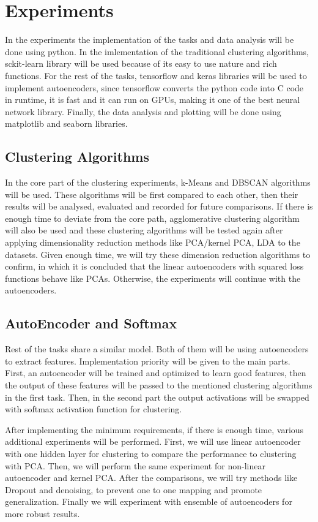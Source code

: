 \documentclass[journal]{IEEEtran}
\begin{document}
\section{Experiments}

In the experiments the implementation of the tasks and data analysis will be done using python. In the imlementation of the traditional clustering algorithms, sckit-learn library will be used because of its easy to use nature and rich functions. For the rest of the tasks, tensorflow and keras libraries will be used to implement autoencoders, since tensorflow converts the python code into C code in runtime, it is fast and it can run on GPUs, making it one of the best neural network library. Finally, the data analysis and plotting will be done using matplotlib and seaborn libraries.

\subsection{Clustering Algorithms}
In the core part of the clustering experiments, k-Means and DBSCAN algorithms will be used. These algorithms will be first compared to each other, then their results will be analysed, evaluated and recorded for future comparisons. If there is enough time to deviate from the core path, agglomerative clustering algorithm will also be used and these clustering algorithms will be tested again after applying dimensionality reduction methods like PCA/kernel PCA, LDA to the datasets. Given enough time, we will try these dimension reduction algorithms to confirm\cite{baldi1989neural}, in which it is concluded that the linear autoencoders with squared loss functions behave like PCAs. Otherwise, the experiments will continue with the autoencoders.  

\subsection{AutoEncoder and Softmax}
Rest of the tasks share a similar model. Both of them will be using autoencoders to extract features. Implementation priority will be given to the main parts. First, an autoencoder will be trained and optimized to learn good features, then the output of these features will be passed to the mentioned clustering algorithms in the first task. Then, in the second part the output activations will be swapped with softmax activation function for clustering.\par
After implementing the minimum requirements, if there is enough time, various additional experiments will be performed. First, we will use linear autoencoder with one hidden layer for clustering to compare the performance to clustering with PCA. Then, we will perform the same experiment for non-linear autoencoder and kernel PCA. After the comparisons, we will try methods like Dropout\cite{srivastava2014dropout} and denoising, to prevent one to one mapping and promote generalization\cite{vincent2010stacked}. Finally we will experiment with ensemble of autoencoders for more robust results. 
\end{document}
